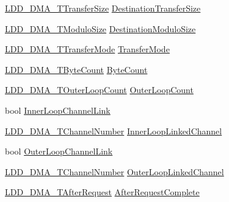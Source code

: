 \begin{DoxyCompactItemize}
\item 
\hyperlink{group___p_e___types__module_ga868f08f9448e5df27a38314f0893d84a}{L\+D\+D\+\_\+\+D\+M\+A\+\_\+\+T\+Transfer\+Size} \hyperlink{struct_l_d_d___d_m_a___t_transfer_descriptor_aab2978b1b8d4a4774a5e2c298d58479f}{Destination\+Transfer\+Size}
\item 
\hyperlink{group___p_e___types__module_gacf2f2d4310e7634351c68e1f64a4c483}{L\+D\+D\+\_\+\+D\+M\+A\+\_\+\+T\+Modulo\+Size} \hyperlink{struct_l_d_d___d_m_a___t_transfer_descriptor_a2d9a37eb9dc192ae554e0dca033a1e3e}{Destination\+Modulo\+Size}
\item 
\hyperlink{group___p_e___types__module_gacd7d4c29cfce815e9e44755c0153f31b}{L\+D\+D\+\_\+\+D\+M\+A\+\_\+\+T\+Transfer\+Mode} \hyperlink{struct_l_d_d___d_m_a___t_transfer_descriptor_a0a932c1e965e131c25e45159f71831fe}{Transfer\+Mode}
\item 
\hyperlink{group___p_e___types__module_gac001a681eb67942fa78ac9b62ba3b0d6}{L\+D\+D\+\_\+\+D\+M\+A\+\_\+\+T\+Byte\+Count} \hyperlink{struct_l_d_d___d_m_a___t_transfer_descriptor_aa02f90cb635b64ab6217e714bcdb1462}{Byte\+Count}
\item 
\hyperlink{group___p_e___types__module_ga9b301dce8846365f4f09bb696f474895}{L\+D\+D\+\_\+\+D\+M\+A\+\_\+\+T\+Outer\+Loop\+Count} \hyperlink{struct_l_d_d___d_m_a___t_transfer_descriptor_a57be3744be0a4cce03a93980199922ee}{Outer\+Loop\+Count}
\item 
bool \hyperlink{struct_l_d_d___d_m_a___t_transfer_descriptor_a3df48f5bf31d359f8d9d28f8841e9b09}{Inner\+Loop\+Channel\+Link}
\item 
\hyperlink{group___p_e___types__module_gad268d607015891269cb015faa8bc0dac}{L\+D\+D\+\_\+\+D\+M\+A\+\_\+\+T\+Channel\+Number} \hyperlink{struct_l_d_d___d_m_a___t_transfer_descriptor_a78eb4ce6c6e05add15799c5389637ce3}{Inner\+Loop\+Linked\+Channel}
\item 
bool \hyperlink{struct_l_d_d___d_m_a___t_transfer_descriptor_a4aad12602586d10ce5e460ed3f20daf4}{Outer\+Loop\+Channel\+Link}
\item 
\hyperlink{group___p_e___types__module_gad268d607015891269cb015faa8bc0dac}{L\+D\+D\+\_\+\+D\+M\+A\+\_\+\+T\+Channel\+Number} \hyperlink{struct_l_d_d___d_m_a___t_transfer_descriptor_a14137cdb670d104436bfdad1bb88f078}{Outer\+Loop\+Linked\+Channel}
\item 
\hyperlink{group___p_e___types__module_ga4c8aa303f53bb05f850fc05d0e19c689}{L\+D\+D\+\_\+\+D\+M\+A\+\_\+\+T\+After\+Request} \hyperlink{struct_l_d_d___d_m_a___t_transfer_descriptor_aef9bdbecdd4c1e3e0072105bc194a63f}{After\+Request\+Complete}

\end{DoxyCompactItemize}
